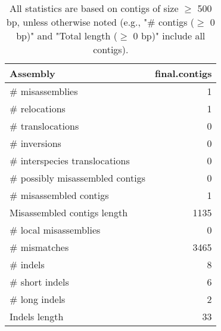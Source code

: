 \documentclass[12pt,a4paper]{article}
\begin{document}
\begin{table}[ht]
\begin{center}
\caption{All statistics are based on contigs of size $\geq$ 500 bp, unless otherwise noted (e.g., "\# contigs ($\geq$ 0 bp)" and "Total length ($\geq$ 0 bp)" include all contigs).}
\begin{tabular}{|l*{1}{|r}|}
\hline
Assembly & final.contigs \\ \hline
\# misassemblies & 1 \\ \hline
\hspace{5mm}\# relocations & 1 \\ \hline
\hspace{5mm}\# translocations & 0 \\ \hline
\hspace{5mm}\# inversions & 0 \\ \hline
\hspace{5mm}\# interspecies translocations & 0 \\ \hline
\# possibly misassembled contigs & 0 \\ \hline
\# misassembled contigs & 1 \\ \hline
Misassembled contigs length & 1135 \\ \hline
\# local misassemblies & 0 \\ \hline
\# mismatches & 3465 \\ \hline
\# indels & 8 \\ \hline
\hspace{5mm}\# short indels & 6 \\ \hline
\hspace{5mm}\# long indels & 2 \\ \hline
Indels length & 33 \\ \hline
\end{tabular}
\end{center}
\end{table}
\end{document}
